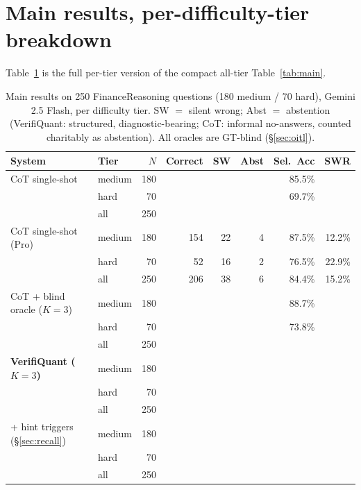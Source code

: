 \section{Main results, per-difficulty-tier breakdown}\label{app:maintiers}
Table~\ref{tab:maintiers} is the full per-tier version of the compact all-tier Table~\ref{tab:main}.
\begin{table}[t]
\caption{Main results on 250 FinanceReasoning questions (180 medium / 70 hard), Gemini 2.5 Flash, per difficulty tier. SW $=$ silent wrong; Abst $=$ abstention (VerifiQuant: structured, diagnostic-bearing; CoT: informal no-answers, counted charitably as abstention). All oracles are GT-blind (\S\ref{sec:oitl}).}
\label{tab:maintiers}
\normalsize
\begin{tabular}{@{}llrrrrrr@{}}
\toprule
System & Tier & $N$ & Correct & SW & Abst & Sel.\ Acc & SWR \\
\midrule
CoT single-shot & medium & 180 & \cotCorrectMed{} & \cotSWMed{} & \cotAbstainMed{} & 85.5\% & \cotSWRMed{} \\
 & hard & 70 & \cotCorrectHard{} & \cotSWHard{} & \cotAbstainHard{} & 69.7\% & \cotSWRHard{} \\
 & all & 250 & \cotCorrectAll{} & \cotSWAll{} & \cotAbstainAll{} & \cotSelAccAll{} & \cotSWRAll{} \\
\midrule
CoT single-shot (Pro) & medium & 180 & 154 & 22 & 4 & 87.5\% & 12.2\% \\
 & hard & 70 & 52 & 16 & 2 & 76.5\% & 22.9\% \\
 & all & 250 & 206 & 38 & 6 & 84.4\% & 15.2\% \\
\midrule
CoT + blind oracle ($K{=}3$) & medium & 180 & \cotoCorrectMed{} & \cotoSWMed{} & \cotoAbstainMed{} & 88.7\% & \cotoSWRMed{} \\
 & hard & 70 & \cotoCorrectHard{} & \cotoSWHard{} & \cotoAbstainHard{} & 73.8\% & \cotoSWRHard{} \\
 & all & 250 & \cotoCorrectAll{} & \cotoSWAll{} & \cotoAbstainAll{} & \cotoSelAccAll{} & \cotoSWRAll{} \\
\midrule
\textbf{VerifiQuant ($K{=}3$)} & medium & 180 & \vqCorrectMed{} & \vqSWMed{} & \vqAbstainMed{} & \vqSelAccMed{} & \textbf{\vqSWRMed{}} \\
 & hard & 70 & \vqCorrectHard{} & \vqSWHard{} & \vqAbstainHard{} & \vqSelAccHard{} & \textbf{\vqSWRHard{}} \\
 & all & 250 & \vqCorrectAll{} & \vqSWAll{} & \vqAbstainAll{} & \vqSelAccAll{} & \textbf{\vqSWRAll{}} \\
\midrule
\quad + hint triggers (\S\ref{sec:recall}) & medium & 180 & \vqtCorrectMed{} & \vqtSWMed{} & \vqtAbstainMed{} & \vqtSelAccMed{} & \textbf{\vqtSWRMed{}} \\
 & hard & 70 & \vqtCorrectHard{} & \vqtSWHard{} & \vqtAbstainHard{} & \vqtSelAccHard{} & \vqtSWRHard{} \\
 & all & 250 & \vqtCorrectAll{} & \vqtSWAll{} & \vqtAbstainAll{} & \vqtSelAccAll{} & \textbf{\vqtSWRAll{}} \\
\bottomrule
\end{tabular}
\end{table}


